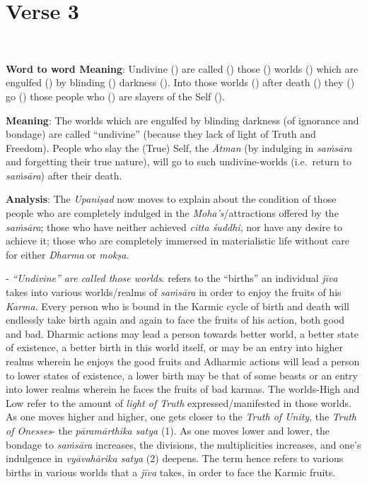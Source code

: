 \chapter{Verse 3}

\begin{moolashloka}
\\
\end{moolashloka}

\textbf{Word to word Meaning}: Undivine () are called () those () worlds () which are engulfed () by blinding () darkness (). Into those worlds () after death () they () go () those people who () are slayers of the Self ().

\textbf{Meaning}: The worlds which are engulfed by blinding darkness (of ignorance and bondage) are called ``undivine'' (because they lack of light of Truth and Freedom). People who slay the (True) Self, the \emph{Ātman} (by indulging in \emph{saṁsāra} and forgetting their true nature), will go to such undivine-worlds (i.e.\ return to \emph{saṁsāra}) after their death.

\textbf{Analysis}: The \emph{Upaniṣad} now moves to explain about the condition of those people who are completely indulged in the \emph{Moha's}/attractions offered by the \emph{saṁsāra}; those who have neither achieved \emph{citta śuddhi}, nor have any desire to achieve it; those who are completely immersed in materialistic life without care for either \emph{Dharma} or \emph{mokṣa}.

- \emph{``Undivine'' are called those worlds}.  refers to the ``births'' an individual \emph{jīva} takes into various worlds/realms of \emph{saṁsāra} in order to enjoy the fruits of his \emph{Karma}. Every person who is bound in the Karmic cycle of birth and death will endlessly take birth again and again to face the fruits of his action, both good and bad. Dharmic actions may lead a person towards better world, a better state of existence, a better birth in this world itself, or may be an entry into higher realms wherein he enjoys the good fruits and Adharmic actions will lead a person to lower states of existence, a lower birth may be that of some beasts or an entry into lower realms wherein he faces the fruits of bad karmas. The worlds-High and Low refer to the amount of \emph{light of Truth} expressed/manifested in those worlds. As one moves higher and higher, one gets closer to the \emph{Truth of Unity}, the \emph{Truth of Onesses}- the \emph{pāramārthika satya} (1). As one moves lower and lower, the bondage to \emph{saṁsāra} increases, the divisions, the multiplicities increases, and one's indulgence in \emph{vyāvahārika satya} (2) deepens. The term  hence refers to various births in various worlds that a \emph{jīva} takes, in order to face the Karmic fruits.

